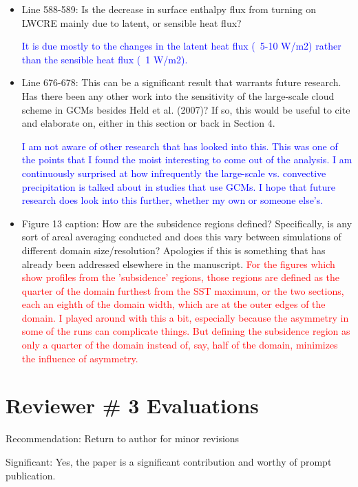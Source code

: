 \documentclass[draft]{agujournal2019}
\begin{document}
\begin{itemize}
  \item Line 588-589: Is the decrease in surface enthalpy flux from turning on LWCRE mainly due to latent, or sensible heat flux?  
  
  \textcolor{blue}{It is due mostly to the changes in the latent heat flux (~5-10 W/m2) rather than the sensible heat flux (~1 W/m2).}

  \item Line 676-678: This can be a significant result that warrants future research. Has there been any other work into the sensitivity of the large-scale cloud scheme in GCMs besides Held et al. (2007)? If so, this would be useful to cite and elaborate on, either in this section or back in Section 4.  
  
  \textcolor{blue}{I am not aware of other research that has looked into this.  This was one of the points that I found the moist interesting to come out of the analysis.  I am continuously surprised at how infrequently the large-scale vs. convective precipitation is talked about in studies that use GCMs.  I hope that future research does look into this further, whether my own or someone else’s.}
  
  \item Figure 13 caption: How are the subsidence regions defined? Specifically, is any sort of areal averaging conducted and does this vary between simulations of different domain size/resolution? Apologies if this is something that has already been addressed elsewhere in the manuscript.   
  \textcolor{red}{For the figures which show profiles from the 'subsidence' regions, those regions are defined as the quarter of the domain furthest from the SST maximum, or the two sections, each an eighth of the domain width, which are at the outer edges of the domain.  I played around with this a bit, especially because the asymmetry in some of the runs can complicate things.  But defining the subsidence region as only a quarter of the domain instead of, say, half of the domain, minimizes the influence of asymmetry.}
  
\end{itemize}

\section{Reviewer \# 3 Evaluations}

Recommendation: Return to author for minor revisions

Significant: Yes, the paper is a significant contribution and worthy of prompt publication.
\end{document}
